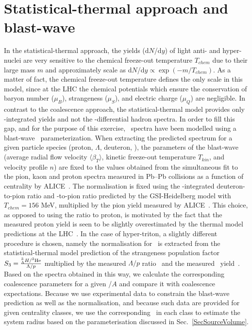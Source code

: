 \section{Statistical-thermal approach and blast-wave}\label{sec:thermal}

In the statistical-thermal approach, the yields (d$N$/d$y$) of light anti- and hyper-nuclei are very sensitive to the chemical freeze-out temperature $T_{chem}$ due to their large mass $m$ and approximately scale as d$N$/d$y \propto \exp(-m/T_{chem})$. As a matter of fact, the chemical freeze-out temperature defines the only scale in this model, since at the LHC the chemical potentials which ensure the conservation of baryon number ($\mu_{B}$), strangeness ($\mu_{S}$), and electric charge ($\mu_{Q}$) are negligible.
In contrast to the coalescence approach, the statistical-thermal model \cite{Petran:2013dva,Wheaton:2004qb,Andronic:2005yp} provides only \pt-integrated yields and not the \pt-differential hadron spectra. 
In order to fill this gap, and for the purpose of this exercise, \pt~spectra have been modelled using a blast-wave~\cite{Schnedermann:1993ws} parameterization. When extracting the predicted spectrum for a given particle species (proton, $\Lambda$, deuteron, \hethree), the parameters of the blast-wave (average radial flow velocity $\langle\beta_{T}\rangle$, kinetic freeze-out temperature $T_{kin}$, and velocity profile $n$) are fixed to the values obtained from the simultaneous fit to the pion, kaon and proton spectra measured in Pb--Pb collisions as a function of centrality by ALICE~\cite{Abelev:2013vea}. 
The normalisation is fixed using the \pt-integrated deuteron-to-pion ratio and \hethree-to-pion ratio predicted by the GSI-Heidelberg model with $T_{chem} = 156$ MeV, multiplied by the pion yield measured by ALICE~\cite{Abelev:2013vea}. 
This choice, as opposed to using the ratio to proton, is motivated by the fact that the measured proton yield is seen to be slightly overestimated by the thermal model predictions at the LHC~\cite{Abelev:2012wca}.
In the case of hyper-triton, a slightly different procedure is chosen, namely the normalisation for \hthreelambda~is extracted from the statistical-thermal model prediction of the strangeness population factor $S_{3} = { _{\Lambda}^{3}H / ^{3}{\mathrm{He}} \over \Lambda/p}$ multiplied by the measured $\Lambda/p$ ratio~\cite{Abelev:2013vea,Abelev:2013xaa} and the measured \hethree~yield~\cite{ALICE:deuteronppPbPb2015}. Based on the spectra obtained in this way, we calculate the corresponding coalescence parameters for a given \pt/$A$ and compare it with coalescence expectations. Because we use experimental data to constrain the blast-wave prediction as well as the normalisation, and because such data are provided for given centrality classes, we use the corresponding \avdNdeta~in each class to estimate the system radius based on the parameterisation discussed in Sec.~\ref{SecSourceVolume}. 
